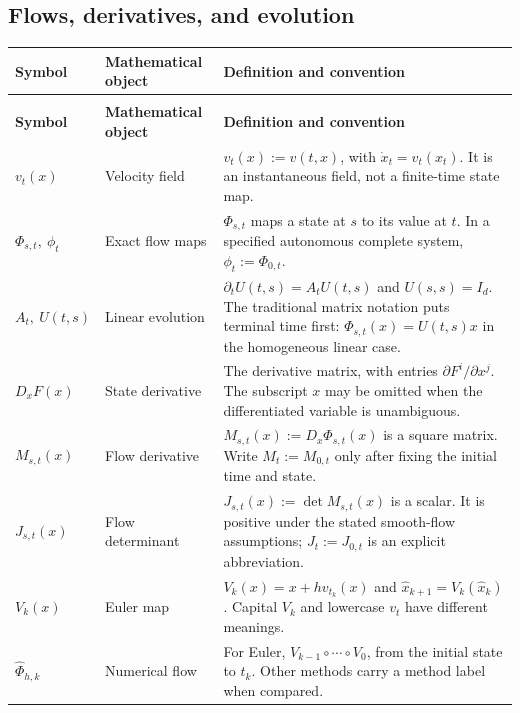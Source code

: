 \subsection*{Flows, derivatives, and evolution}
\begingroup
\small
{}
\setlength{\tabcolsep}{4pt}
\renewcommand{\arraystretch}{1.16}
\begin{longtable}{@{}>{\raggedright\arraybackslash}p{32mm}>{\raggedright\arraybackslash}p{26mm}>{\raggedright\arraybackslash}p{90mm}@{}}
\toprule
\textbf{Symbol} & \textbf{Mathematical object} & \textbf{Definition and convention}\\
\midrule
\endfirsthead
\multicolumn{3}{@{}l}{\small\itshape Flows, derivatives, and evolution (continued)}\\[3pt]
\toprule
\textbf{Symbol} & \textbf{Mathematical object} & \textbf{Definition and convention}\\
\midrule
\endhead
\bottomrule
\endfoot
$v_t(x)$ & Velocity field & $v_t(x):=v(t,x)$, with $\dot x_t=v_t(x_t)$. It is an instantaneous field, not a finite-time state map.\\[3pt]
$\Phi_{s,t},\ \phi_t$ & Exact flow maps & $\Phi_{s,t}$ maps a state at $s$ to its value at $t$. In a specified autonomous complete system, $\phi_t:=\Phi_{0,t}$.\\[3pt]
$A_t,\ U(t,s)$ & Linear evolution & $\partial_tU(t,s)=A_tU(t,s)$ and $U(s,s)=I_d$. The traditional matrix notation puts terminal time first: $\Phi_{s,t}(x)=U(t,s)x$ in the homogeneous linear case.\\[3pt]
$D_xF(x)$ & State derivative & The derivative matrix, with entries $\partial F^i/\partial x^j$. The subscript $x$ may be omitted when the differentiated variable is unambiguous.\\[3pt]
$M_{s,t}(x)$ & Flow derivative & $M_{s,t}(x):=D_x\Phi_{s,t}(x)$ is a square matrix. Write $M_t:=M_{0,t}$ only after fixing the initial time and state.\\[3pt]
$J_{s,t}(x)$ & Flow determinant & $J_{s,t}(x):=\det M_{s,t}(x)$ is a scalar. It is positive under the stated smooth-flow assumptions; $J_t:=J_{0,t}$ is an explicit abbreviation.\\[3pt]
$V_k(x)$ & Euler map & $V_k(x)=x+hv_{t_k}(x)$ and $\widehat x_{k+1}=V_k(\widehat x_k)$. Capital $V_k$ and lowercase $v_t$ have different meanings.\\[3pt]
$\widehat\Phi_{h,k}$ & Numerical flow & For Euler, $V_{k-1}\circ\cdots\circ V_0$, from the initial state to $t_k$. Other methods carry a method label when compared.\\[3pt]

\end{longtable}
